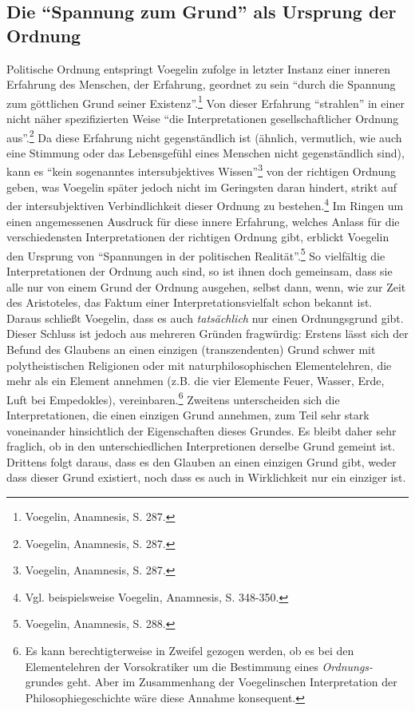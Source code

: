 \subsection{Die "`Spannung zum Grund"' als Ursprung der Ordnung}

Politische Ordnung entspringt Voegelin zufolge in letzter Instanz einer
inneren Erfahrung des Menschen, der Erfahrung, geordnet zu sein "`durch die
Spannung zum göttlichen Grund seiner Existenz"'.\footnote{Voegelin, Anamnesis,
  S. 287.} Von dieser Erfahrung "`strahlen"' in einer nicht näher
spezifizierten Weise "`die Interpretationen gesellschaftlicher Ordnung
aus"'.\footnote{Voegelin, Anamnesis, S. 287.} Da diese Erfahrung nicht
gegenständlich ist (ähnlich, vermutlich, wie auch eine Stimmung oder das
Lebensgefühl eines Menschen nicht gegenständlich sind), kann es "`kein
sogenanntes intersubjektives Wissen"'\footnote{Voegelin, Anamnesis, S. 287.}
von der richtigen Ordnung geben, was Voegelin später jedoch nicht im
Geringsten daran hindert, strikt auf der intersubjektiven Verbindlichkeit
dieser Ordnung zu bestehen.\footnote{Vgl. beispielsweise Voegelin,
  Anamnesis, S. 348-350.}  Im Ringen um einen angemessenen Ausdruck für diese
innere Erfahrung, welches Anlass für die verschiedensten Interpretationen der
richtigen Ordnung gibt, erblickt Voegelin den Ursprung von "`Spannungen in der
politischen Realität"'.\footnote{Voegelin, Anamnesis, S. 288.} So vielfältig
die Interpretationen der Ordnung auch sind, so ist ihnen doch gemeinsam, dass
sie alle nur von einem Grund der Ordnung ausgehen, selbst dann, wenn, wie zur
Zeit des Aristoteles, das Faktum einer Interpretationsvielfalt schon bekannt
ist.  Daraus schließt Voegelin, dass es auch {\em tatsächlich} nur einen
Ordnungsgrund gibt. Dieser Schluss ist jedoch aus mehreren Gründen fragwürdig:
Erstens lässt sich der Befund des Glaubens an einen einzigen (transzendenten)
Grund schwer mit polytheistischen Religionen oder mit naturphilosophischen
Elementelehren, die mehr als ein Element annehmen (z.B. die vier Elemente
Feuer, Wasser, Erde, Luft bei Empedokles), vereinbaren.\footnote{Es kann
  berechtigterweise in Zweifel gezogen werden, ob es bei den Elementelehren
  der Vorsokratiker um die Bestimmung eines {\it Ordnungs-}grundes geht. Aber
  im Zusammenhang der Voegelinschen Interpretation der Philosophiegeschichte
  wäre diese Annahme konsequent.} Zweitens unterscheiden sich die
Interpretationen, die einen einzigen Grund annehmen, zum Teil sehr stark
voneinander hinsichtlich der Eigenschaften dieses Grundes. Es bleibt daher
sehr fraglich, ob in den unterschiedlichen Interpretionen derselbe Grund
gemeint ist.  Drittens folgt daraus, dass es den Glauben an einen einzigen
Grund gibt, weder dass dieser Grund existiert, noch dass es auch in
Wirklichkeit nur ein einziger ist.

